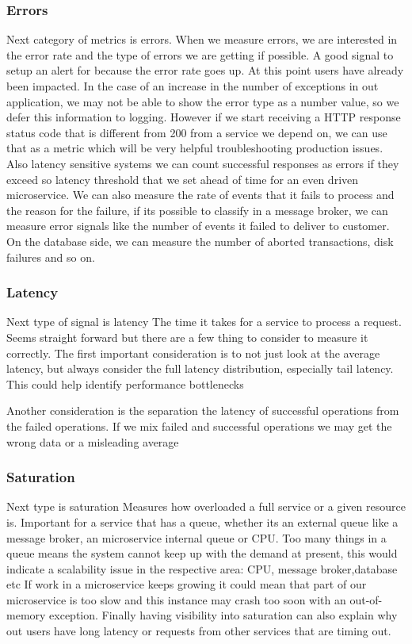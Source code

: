 \subsubsection{Errors}
Next category of metrics is errors.
When we measure errors, we are interested in the error rate and the type of errors we are getting if possible.
A good signal to setup an alert for because the error rate goes up.
At this point users have already been impacted.
In the case of an increase in the number of exceptions in out application, we may not be able to show the error type as a number value, so we defer this information to logging.
However if we start receiving a HTTP response status code that is different from 200 from a service we depend on, we can use that as a metric which will be very helpful troubleshooting production issues.
Also latency sensitive systems we can count successful responses as errors if they exceed so latency threshold that we set ahead of time for an even driven microservice.
We can also measure the rate of events that it fails to process and the reason for the failure, if its possible to classify in a message broker, we can measure error signals like the number of events it failed to deliver to customer.
On the database side, we can measure the number of aborted transactions, disk failures and so on.

\subsubsection{Latency}
Next type of signal is latency
The time it takes for a service to process a request.
Seems straight forward but there are a few thing to consider to measure it correctly.
The first important consideration is to not just look at the average latency, but always consider the full latency distribution, especially tail latency.
This could help identify performance bottlenecks

Another consideration is the separation the latency of successful operations from the failed operations.
If we mix failed and successful operations we may get the wrong data or a misleading average

\subsubsection{Saturation}
Next type is saturation
Measures how overloaded a full service or a given resource is.
Important for a service that has a queue, whether its an external queue like a message broker, an microservice internal queue or CPU.
Too many things in a queue means the system cannot keep up with the demand at present, this would indicate a scalability issue in the respective area: CPU, message broker,database etc
If work in a microservice keeps growing it could mean that part of our microservice is too slow and this instance may crash too soon with an out-of-memory exception.
Finally having visibility into saturation can also explain why out users have long latency or requests from other services that are timing out.

